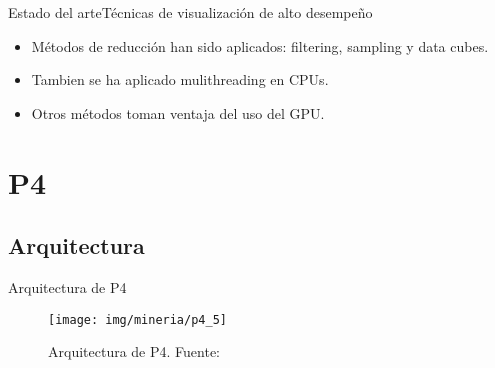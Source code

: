 \documentclass[10pt]{beamer}
\newcommand{\1}{
        	\setbeamertemplate{background}{
        		\texttt{[image: img/1]}
        		\tikz[overlay] \fill[fill opacity=0.75,fill=white] (0,0) rectangle (-\paperwidth,\paperheight);
        	}
}
\begin{document}
\begin{frame}{Estado del arte}{Técnicas de visualización de alto desempeño}	
	\begin{itemize}
		\item Métodos de reducción han sido aplicados: filtering, sampling y data cubes. \pause
		\item Tambien se ha aplicado mulithreading en CPUs. \pause
		\item Otros métodos toman ventaja del uso del GPU. \pause
	\end{itemize}
\end{frame}


\section{P4}

\subsection{Arquitectura}


\begin{frame}{Arquitectura de P4}
	\begin{figure}[]
		\centering
		\texttt{[image: img/mineria/p4\_5]}
		\caption{Arquitectura de P4. Fuente: \cite{li2018p4}}
	\end{figure}	
\end{frame}
\end{document}
